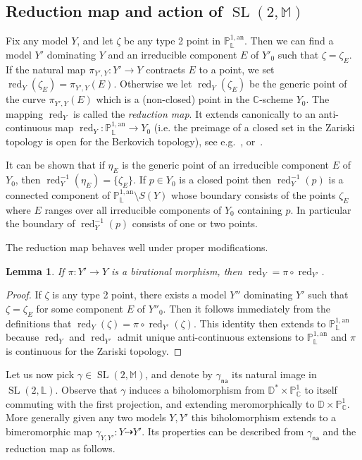 \documentclass[10pt]{amsart}
\newtheorem{lemm}[theo]{Lemma}\newtheorem{prop}[theo]{Proposition}\newtheorem{coro}[theo]{Corollary}\newtheorem{conj}[theo]{Conjecture}
\theoremstyle{definition}\newtheorem{defi}[theo]{Definition}\newtheorem{rema}[theo]{Remark}\newtheorem{exam}[theo]{Example}\newtheorem{exem}[theo]{Example}\newtheorem{nota}[theo]{Notation}
\DeclareMathOperator{\red}{red}
\DeclareMathOperator{\SL}{SL}
\newcommand{\cc}{\mathbb{C}}
\newcommand{\dD}{\mathbb{D}}
\newcommand{\mm}{\mathbb{M}}
\newcommand{\an}{\mathrm{an}}
\newcommand{\PP}{\mathbb{P}}
\newcommand{\berkl}{\mathbb P^{1,\an}_{\Laurent}}
\newcommand{\Laurent}{\mathbb{L}}
\newcommand{\na}{\mathsf{na}}
\begin{document}
\subsection{Reduction map and action of \texorpdfstring{$ \SL(2,\mm)$}{SL(2, mm)}}\label{subs:reduction}

Fix any model $Y$, and let $\zeta$ be any type 2 point in $\PP^{1,\an}_{\Laurent}$. Then we can find a model $Y'$ dominating $Y$ and an irreducible component $E$ of $Y'_0$ such that $\zeta = \zeta_E$. If the natural map $\pi_{Y',Y}: Y' \to Y$ contracts $E$ to a point, we set $\red_Y(\zeta_E) = \pi_{Y',Y}(E)$. Otherwise we let $\red_Y(\zeta_E)$ be the generic point of the curve $\pi_{Y',Y}(E)$ which is a (non-closed) point in the $\cc$-scheme $Y_0$. The mapping $\red_Y$ is called the \emph{reduction map}. It extends canonically to an anti-continuous map $\red_Y: \PP^{1,\an}_{\Laurent}\to Y_0$ (i.e. the preimage of a closed set in the Zariski topology is open for the Berkovich topology), see e.g.~\cite[\S 5.2.4]{temkin}, or~\cite[\S 4.2]{demarco-faber-2}.

It can be shown that if $\eta_E$ is the generic point of an irreducible component $E$ of $Y_0$, then $\red_Y^{-1}(\eta_E) = \{ \zeta_E\}$. If $p\in Y_0$ is a closed point then $\red_Y^{-1}(p)$ is a connected component of $\berkl\setminus {S}(Y)$ whose boundary consists of the points $\zeta_E$ where $E$ ranges over all irreducible components of $Y_0$ containing $p$. In particular the boundary of $\red_Y^{-1}(p)$ consists of one or two points.

The reduction map behaves well under proper modifications.

\begin{lemm}\label{lem:reduction modification}
If $\pi: Y'\to Y$ is a birational morphism, then $\red_Y = \pi\circ \red_{Y'}$.
\end{lemm}

\begin{proof}
If $\zeta$ is any type 2 point, there exists a model $Y''$ dominating $Y'$ such that $\zeta = \zeta_E$ for some component $E$ of $Y''_0$. Then it follows immediately from the definitions that $\red_Y (\zeta)= \pi\circ \red_{Y'}(\zeta)$. This identity then extends to $\berkl$ because $\red_Y$ and $\red_{Y'}$ admit unique anti-continuous extensions to $\berkl$ and $\pi$ is continuous for the Zariski topology.
\end{proof}

Let us now pick $\gamma \in \SL(2, \mm)$, and denote by $\gamma_\na$ its natural image in $\SL(2, \Laurent)$. Observe that $\gamma$ induces a biholomorphism from $\dD^*\times \PP^1_\cc$ to itself commuting with the first projection, and extending meromorphically to $\dD \times \PP^1_\cc$. More generally given any two models $Y,Y'$ this biholomorphism extends to a bimeromorphic map $\gamma_{Y,Y'}: Y \dashrightarrow Y'$. Its properties can be described from $\gamma_\na$ and the reduction map as follows.
\end{document}
